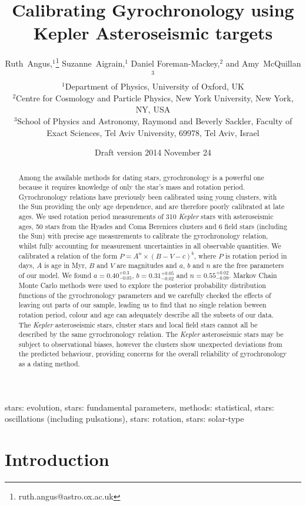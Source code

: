 \documentclass[useAMS, usenatbib]{mn2e}
\title{Calibrating Gyrochronology using Kepler Asteroseismic targets}
\author[R.~Angus \emph{et al.}]{%
    Ruth~Angus,$^1$\thanks{ruth.angus@astro.ox.ac.uk}
    Suzanne~Aigrain,$^1$
    Daniel Foreman-Mackey,$^2$ and
    Amy~McQuillan$^3$ \\
    $^1$Department of Physics, University of Oxford, UK \\
    $^2$Centre for Cosmology and Particle Physics, New York University, New York, NY, USA \\
    $^3$School of Physics and Astronomy, Raymond and Beverly Sackler, Faculty of Exact Sciences, Tel Aviv University, 69978, Tel Aviv, Israel}
\begin{document}
\date{Draft version 2014 November 24}
\maketitle

\begin{abstract}

Among the available methods for dating stars, gyrochronology is a powerful one
because it requires knowledge of only the star's mass and rotation period.
Gyrochronology relations have previously been calibrated using young
clusters, with the Sun providing the only age dependence, and are therefore
poorly calibrated at late ages.
We used rotation period measurements of 310 {\it Kepler} stars with
asteroseismic ages, 50 stars from the Hyades and Coma Berenices clusters and
6 field stars (including the Sun) with precise age measurements to calibrate
the gyrochronology relation, whilst fully accounting for measurement
uncertainties in all observable quantities.
We calibrated a relation of the form $P=A^n\times(B-V-c)^b$, where $P$ is
rotation period in days, $A$ is age in Myr, $B$ and $V$ are magnitudes and
$a$, $b$ and $n$ are the free parameters of our model.
We found $a = 0.40^{+0.3}_{-0.05}$, $b = 0.31^{+0.05}_{-0.02}$ and
$n = 0.55^{+0.02}_{-0.09}$.
Markov Chain Monte Carlo methods were used to explore the posterior probability
distribution functions of the gyrochronology parameters and we carefully
checked the effects of leaving out parts of our sample, leading us to find that
no single relation beween rotation period, colour
and age can adequately describe all the subsets of our data.
The {\it Kepler} asteroseismic stars, cluster stars and local field
stars cannot all be described by the same gyrochronology relation.
The {\it Kepler} asteroseismic stars may be subject to observational biases,
however the clusters show unexpected deviations from the predicted behaviour,
providing concerns for the overall reliability of gyrochronology as a dating
method.

\end{abstract}

\begin{keywords}
stars: evolution, stars: fundamental parameters, methods: statistical, stars:
oscillations (including pulsations), stars: rotation, stars: solar-type
\end{keywords}

\section{Introduction}
\label{intro}
\end{document}
